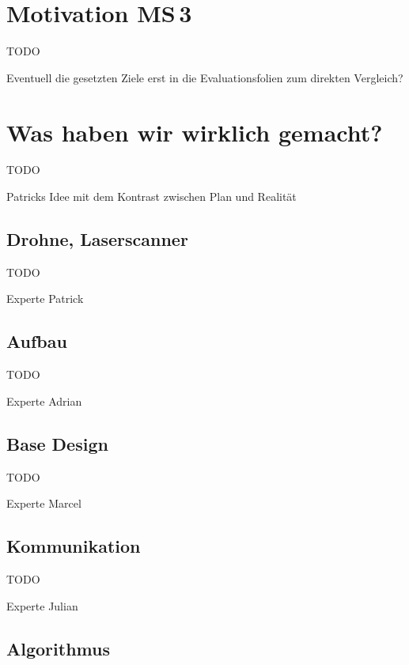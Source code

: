\documentclass{beamer}
\begin{document}
\section{Motivation MS\,3}
\begin{frame}{\secname}
TODO

Eventuell die gesetzten Ziele erst in die Evaluationsfolien zum direkten Vergleich?
\end{frame}

\section{Was haben wir wirklich gemacht?}
\begin{frame}{\secname}
TODO

Patricks Idee mit dem Kontrast zwischen Plan und Realität
\end{frame}

\subsection{Drohne, Laserscanner}
\begin{frame}{\subsecname}
TODO

Experte Patrick
\end{frame}

\subsection{Aufbau}
\begin{frame}{\subsecname}
TODO

Experte Adrian
\end{frame}

\subsection{Base Design}
\begin{frame}{\subsecname}
TODO

Experte Marcel
\end{frame}

\subsection{Kommunikation}
\begin{frame}{\subsecname}
TODO

Experte Julian
\end{frame}

\subsection{Algorithmus}
\end{document}
